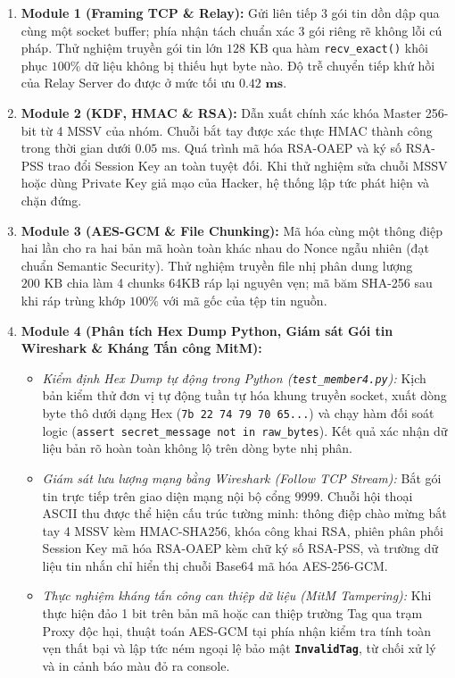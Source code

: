 \documentclass[a4paper,12pt]{article}
\begin{document}
\begin{enumerate}
    \item \textbf{Module 1 (Framing TCP \& Relay):} Gửi liên tiếp 3 gói tin dồn dập qua cùng một socket buffer; phía nhận tách chuẩn xác 3 gói riêng rẽ không lỗi cú pháp. Thử nghiệm truyền gói tin lớn $128\text{ KB}$ qua hàm \texttt{recv\_exact()} khôi phục $100\%$ dữ liệu không bị thiếu hụt byte nào. Độ trễ chuyển tiếp khứ hồi của Relay Server đo được ở mức tối ưu $\mathbf{0.42\text{ ms}}$.
    \item \textbf{Module 2 (KDF, HMAC \& RSA):} Dẫn xuất chính xác khóa Master 256-bit từ 4 MSSV của nhóm. Chuỗi bắt tay được xác thực HMAC thành công trong thời gian dưới $0.05\text{ ms}$. Quá trình mã hóa RSA-OAEP và ký số RSA-PSS trao đổi Session Key an toàn tuyệt đối. Khi thử nghiệm sửa chuỗi MSSV hoặc dùng Private Key giả mạo của Hacker, hệ thống lập tức phát hiện và chặn đứng.
    \item \textbf{Module 3 (AES-GCM \& File Chunking):} Mã hóa cùng một thông điệp hai lần cho ra hai bản mã hoàn toàn khác nhau do Nonce ngẫu nhiên (đạt chuẩn Semantic Security). Thử nghiệm truyền file nhị phân dung lượng $200\text{ KB}$ chia làm 4 chunks 64KB ráp lại nguyên vẹn; mã băm SHA-256 sau khi ráp trùng khớp $100\%$ với mã gốc của tệp tin nguồn.
    \item \textbf{Module 4 (Phân tích Hex Dump Python, Giám sát Gói tin Wireshark \& Kháng Tấn công MitM):}
    \begin{itemize}
        \item \textit{Kiểm định Hex Dump tự động trong Python (\texttt{test\_member4.py}):} Kịch bản kiểm thử đơn vị tự động tuần tự hóa khung truyền socket, xuất dòng byte thô dưới dạng Hex (\texttt{7b 22 74 79 70 65...}) và chạy hàm đối soát logic (\texttt{assert secret\_message not in raw\_bytes}). Kết quả xác nhận dữ liệu bản rõ hoàn toàn không lộ trên dòng byte nhị phân.
        \item \textit{Giám sát lưu lượng mạng bằng Wireshark (Follow TCP Stream):} Bắt gói tin trực tiếp trên giao diện mạng nội bộ cổng $9999$. Chuỗi hội thoại ASCII thu được thể hiện cấu trúc tường minh: thông điệp chào mừng bắt tay 4 MSSV kèm HMAC-SHA256, khóa công khai RSA, phiên phân phối Session Key mã hóa RSA-OAEP kèm chữ ký số RSA-PSS, và trường dữ liệu tin nhắn chỉ hiển thị chuỗi Base64 mã hóa AES-256-GCM.
        \item \textit{Thực nghiệm kháng tấn công can thiệp dữ liệu (MitM Tampering):} Khi thực hiện đảo 1 bit trên bản mã hoặc can thiệp trường Tag qua trạm Proxy độc hại, thuật toán AES-GCM tại phía nhận kiểm tra tính toàn vẹn thất bại và lập tức ném ngoại lệ bảo mật \textbf{\texttt{InvalidTag}}, từ chối xử lý và in cảnh báo màu đỏ ra console.
    \end{itemize}
\end{enumerate}
\end{document}
